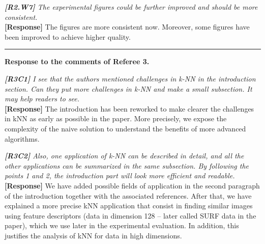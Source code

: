 \documentclass[11pt]{letter}
\newcommand{\svs}{\vspace{0.36ex}}
\newcommand{\TODO}[1]{\textcolor{red}{\textbf{[TODO:#1]}}}
\begin{document}

\svs
\noindent
{\em
{\bf [R2.W7]}
The experimental figures could be further improved and should be more consistent.}\\
\textbf{[Response]} The figures are more consistent now. Moreover, some figures have been improved to achieve higher quality.



\vspace{2.8ex}
\hrule
\vspace{0.6ex}
{\bf Response to the comments of Referee 3.}

\svs
\noindent
{\em
{\bf [R3C1]}
 I see that the authors mentioned challenges in k-NN in the introduction section. Can they put more challenges in k-NN 
 and make a small subsection. It may help readers to see.}\\
\textbf{[Response]}
The introduction has been reworked to make clearer the challenges in kNN as early as possible in the paper. More 
precisely, we expose the complexity of the naive solution to understand the benefits of  more advanced algorithms.

\svs
\noindent
{\em
{\bf [R3C2]}
Also, one application of k-NN can be described in detail, and all the other applications can be summarized in the same 
subsection. By following the points 1 and 2, the introduction part will look more efficient and readable.}\\
\textbf{[Response]}
We have added possible fields of application in the second paragraph of the introduction together with the associated 
references. After that, we have explained a more precise kNN application that consist in finding similar images using 
feature descriptors (data in dimension 128 -- later called SURF data in the paper), which we use later in the 
experimental evaluation. In addition, this justifies the analysis of kNN for data in high dimensions.
 
\end{document}

